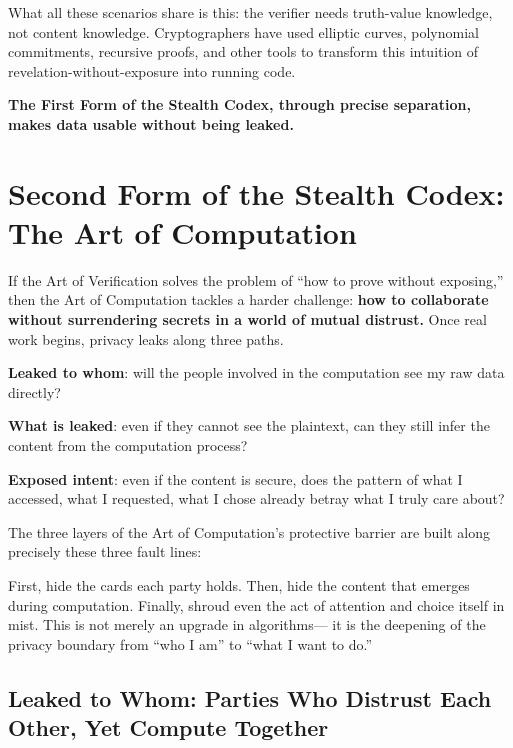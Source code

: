 \vspace{1em}

What all these scenarios share is this: the verifier needs truth-value knowledge, not content knowledge. Cryptographers have used elliptic curves, polynomial commitments, recursive proofs, and other tools to transform this intuition of revelation-without-exposure into running code.

\vspace{1em}

\textbf{The First Form of the Stealth Codex, through precise separation, makes data usable without being leaked.}

\newpage

\section{Second Form of the Stealth Codex: The Art of Computation}

If the Art of Verification solves the problem of ``how to prove without exposing,'' then the Art of Computation tackles a harder challenge:
\textbf{how to collaborate without surrendering secrets in a world of mutual distrust.}
Once real work begins, privacy leaks along three paths.

\vspace{1em}

\textbf{Leaked to whom}: will the people involved in the computation see my raw data directly?

\textbf{What is leaked}: even if they cannot see the plaintext, can they still infer the content from the computation process?

\textbf{Exposed intent}: even if the content is secure, does the pattern of what I accessed, what I requested, what I chose already betray what I truly care about?

\vspace{1em}

The three layers of the Art of Computation's protective barrier are built along precisely these three fault lines:

First, hide the cards each party holds.
Then, hide the content that emerges during computation.
Finally, shroud even the act of attention and choice itself in mist.
This is not merely an upgrade in algorithms---
it is the deepening of the privacy boundary from ``who I am'' to ``what I want to do.''


\subsection{Leaked to Whom: Parties Who Distrust Each Other, Yet Compute Together}

